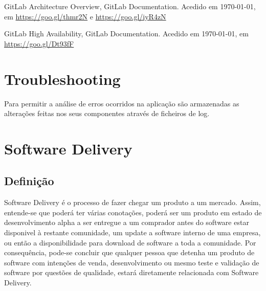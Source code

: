 \documentclass[12pt,a4paper]{article}
\begin{document}
\bigbreak
GitLab Architecture Overview, GitLab Documentation. Acedido em \today, em \url{https://goo.gl/thmr2N} e \url{https://goo.gl/iyR4zN} 

\bigbreak
GitLab High Availability, GitLab Documentation. Acedido em \today, em \url{https://goo.gl/Dt93fF}















\iffalse
\newpage
\section{Troubleshooting}

Para permitir a análise de erros ocorridos na aplicação são armazenadas as alterações feitas nos seus componentes através de ficheiros de log.
\newpage

\section{Software Delivery}
\subsection{Definição}
Software Delivery é o processo de fazer chegar um produto a um mercado. Assim, entende-se que poderá ter várias conotações, poderá ser um produto em estado de desenvolvimento alpha a ser entregue a um comprador antes do software estar disponivel à restante comunidade, um update a software interno de uma empresa, ou então a disponibilidade para download de software a toda a comunidade.
Por consequência, pode-se concluir que qualquer pessoa que detenha um produto de software com intenções de venda, desenvolvimento ou mesmo teste e validação de software por questões de qualidade, estará diretamente relacionada com Software Delivery.
\end{document}
